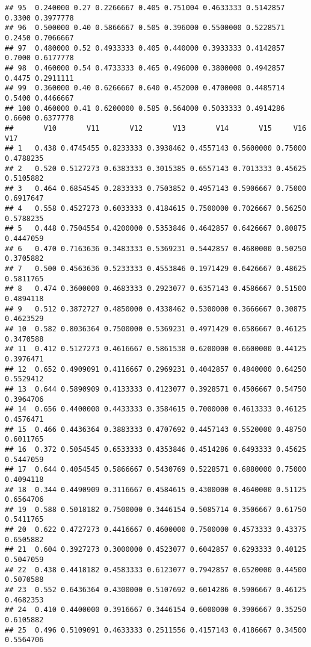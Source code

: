 \documentclass[
]{article}
\begin{document}
\begin{verbatim}
## 95  0.240000 0.27 0.2266667 0.405 0.751004 0.4633333 0.5142857 0.3300 0.3977778
## 96  0.500000 0.40 0.5866667 0.505 0.396000 0.5500000 0.5228571 0.2450 0.7066667
## 97  0.480000 0.52 0.4933333 0.405 0.440000 0.3933333 0.4142857 0.7000 0.6177778
## 98  0.460000 0.54 0.4733333 0.465 0.496000 0.3800000 0.4942857 0.4475 0.2911111
## 99  0.360000 0.40 0.6266667 0.640 0.452000 0.4700000 0.4485714 0.5400 0.4466667
## 100 0.460000 0.41 0.6200000 0.585 0.564000 0.5033333 0.4914286 0.6600 0.6377778
##       V10       V11       V12       V13       V14       V15     V16       V17
## 1   0.438 0.4745455 0.8233333 0.3938462 0.4557143 0.5600000 0.75000 0.4788235
## 2   0.520 0.5127273 0.6383333 0.3015385 0.6557143 0.7013333 0.45625 0.5105882
## 3   0.464 0.6854545 0.2833333 0.7503852 0.4957143 0.5906667 0.75000 0.6917647
## 4   0.558 0.4527273 0.6033333 0.4184615 0.7500000 0.7026667 0.56250 0.5788235
## 5   0.448 0.7504554 0.4200000 0.5353846 0.4642857 0.6426667 0.80875 0.4447059
## 6   0.470 0.7163636 0.3483333 0.5369231 0.5442857 0.4680000 0.50250 0.3705882
## 7   0.500 0.4563636 0.5233333 0.4553846 0.1971429 0.6426667 0.48625 0.5811765
## 8   0.474 0.3600000 0.4683333 0.2923077 0.6357143 0.4586667 0.51500 0.4894118
## 9   0.512 0.3872727 0.4850000 0.4338462 0.5300000 0.3666667 0.30875 0.4623529
## 10  0.582 0.8036364 0.7500000 0.5369231 0.4971429 0.6586667 0.46125 0.3470588
## 11  0.412 0.5127273 0.4616667 0.5861538 0.6200000 0.6600000 0.44125 0.3976471
## 12  0.652 0.4909091 0.4116667 0.2969231 0.4042857 0.4840000 0.64250 0.5529412
## 13  0.644 0.5890909 0.4133333 0.4123077 0.3928571 0.4506667 0.54750 0.3964706
## 14  0.656 0.4400000 0.4433333 0.3584615 0.7000000 0.4613333 0.46125 0.4576471
## 15  0.466 0.4436364 0.3883333 0.4707692 0.4457143 0.5520000 0.48750 0.6011765
## 16  0.372 0.5054545 0.6533333 0.4353846 0.4514286 0.6493333 0.45625 0.5447059
## 17  0.644 0.4054545 0.5866667 0.5430769 0.5228571 0.6880000 0.75000 0.4094118
## 18  0.344 0.4490909 0.3116667 0.4584615 0.4300000 0.4640000 0.51125 0.6564706
## 19  0.588 0.5018182 0.7500000 0.3446154 0.5085714 0.3506667 0.61750 0.5411765
## 20  0.622 0.4727273 0.4416667 0.4600000 0.7500000 0.4573333 0.43375 0.6505882
## 21  0.604 0.3927273 0.3000000 0.4523077 0.6042857 0.6293333 0.40125 0.5047059
## 22  0.438 0.4418182 0.4583333 0.6123077 0.7942857 0.6520000 0.44500 0.5070588
## 23  0.552 0.6436364 0.4300000 0.5107692 0.6014286 0.5906667 0.46125 0.4682353
## 24  0.410 0.4400000 0.3916667 0.3446154 0.6000000 0.3906667 0.35250 0.6105882
## 25  0.496 0.5109091 0.4633333 0.2511556 0.4157143 0.4186667 0.34500 0.5564706

\end{verbatim}
\end{document}
